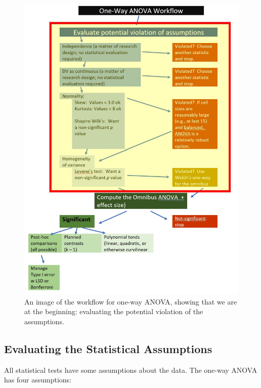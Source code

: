 \documentclass[
  11pt,
]{book}
\begin{document}
\begin{figure}
\centering
\includegraphics{images/oneway/OnewayWrkFlw_Asmptns.jpg}
\caption{An image of the workflow for one-way ANOVA, showing that we are at the beginning: evaluating the potential violation of the assumptions.}
\end{figure}

\hypertarget{evaluating-the-statistical-assumptions}{%
\subsection{Evaluating the Statistical Assumptions}\label{evaluating-the-statistical-assumptions}}

All statistical tests have some assumptions about the data. The one-way ANOVA has four assumptions:
\end{document}
